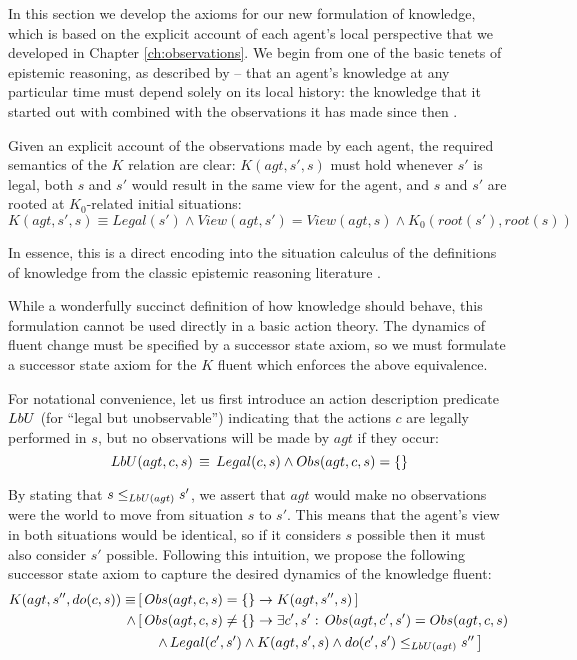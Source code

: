 In this section we develop the axioms for our new formulation of knowledge,
which is based on the explicit account of each agent's local perspective
that we developed in Chapter \ref{ch:observations}. We begin from
one of the basic tenets of epistemic reasoning, as described by \citep{halpern90knowledge_distrib}
-- that an agent's knowledge at any particular time must depend solely
on its local history: the knowledge that it started out with combined
with the observations it has made since then .

Given an explicit account of the observations made by each agent,
the required semantics of the $K$ relation are clear: $K(agt,s',s)$
must hold whenever $s'$ is legal, both $s$ and $s'$ would result
in the same view for the agent, and $s$ and $s'$ are rooted at $K_{0}$-related
initial situations:\begin{equation}
K(agt,s',s)\equiv Legal(s')\wedge View(agt,s')=View(agt,s)\wedge K_{0}(root(s'),root(s))\label{eq:k-desired}\end{equation}


In essence, this is a direct encoding into the situation calculus
of the definitions of knowledge from the classic epistemic reasoning
literature \citep{parikh85dist_knowledge,halpern90knowledge_distrib,fagin95}.

While a wonderfully succinct definition of how knowledge should behave,
this formulation cannot be used directly in a basic action theory.
The dynamics of fluent change must be specified by a successor state
axiom, so we must formulate a successor state axiom for the $K$ fluent
which enforces the above equivalence.

For notational convenience, let us first introduce an action description
predicate $LbU$ (for {}``legal but unobservable'') indicating
that the actions $c$ are legally performed in $s$, but no observations
will be made by $agt$ if they occur:\begin{equation}
LbU(agt,c,s)\,\equiv\, Legal(c,s)\wedge Obs(agt,c,s)=\{\}\label{eqn:LbU_defn}\end{equation}


By stating that $s\leq_{LbU(agt)}s'$, we assert that $agt$ would
make no observations were the world to move from situation $s$ to
$s'$. This means that the agent's view in both situations would be
identical, so if it considers $s$ possible then it must also consider
$s'$ possible. Following this intuition, we propose the following
successor state axiom to capture the desired dynamics of the knowledge
fluent:\begin{align}
K(agt,s'',do(c,s))\equiv & \left[\, Obs(agt,c,s)=\{\}\rightarrow K(agt,s'',s)\,\right]\nonumber \\
\wedge & \left[\, Obs(agt,c,s)\neq\{\}\rightarrow\exists c',s':\, Obs(agt,c',s')=Obs(agt,c,s)\right.\nonumber \\
 & \left.\,\,\,\,\,\,\,\,\wedge\, Legal(c',s')\wedge K(agt,s',s)\wedge do(c',s')\leq_{LbU(agt)}s''\,\right]\label{eqn:new_k_ssa}\end{align}


